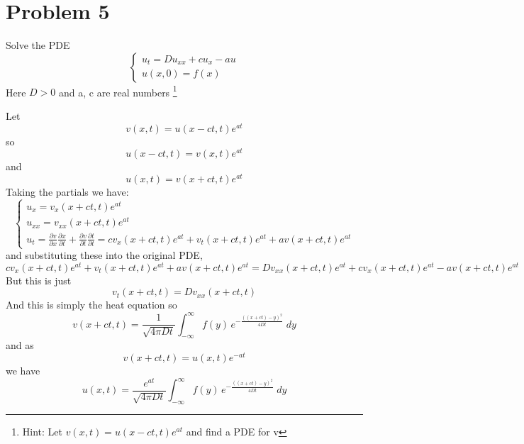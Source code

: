 \documentclass[12pt]{article}
\begin{document}
\pagebreak 
\color{black}
\section*{Problem 5}
Solve the PDE 
\[\begin{cases}
    u_t = Du_{xx} + cu_x - au\\
    u(x, 0) = f(x)
\end{cases}\]
Here $D > 0$ and a, c are real numbers \footnote{Hint: Let $v(x, t) = u(x - ct, t)e^{at}$ and find a PDE for v}

\color{blue}
Let 
\[v(x, t) = u(x - ct, t)e^{at}\]
so 
\[u(x - ct, t) = v(x, t)e^{at}\]
and 
\[u(x, t) = v(x + ct, t)e^{at}\]
Taking the partials we have:
\[\begin{cases}
    u_x = v_x(x + ct, t)e^{at}\\
    u_{xx} = v_{xx}(x + ct, t)e^{at}\\
    u_t = \frac{\partial v}{\partial x}\frac{\partial x}{\partial t} + \frac{\partial v}{\partial t}\frac{\partial t}{\partial t} = cv_x(x + ct, t)e^{at} + v_t(x + ct, t)e^{at} + av(x + ct, t)e^{at}
\end{cases}\]
and substituting these into the original PDE, 
\[cv_x(x + ct, t)e^{at} + v_t(x + ct, t)e^{at} + av(x + ct, t)e^{at} = Dv_{xx}(x + ct, t)e^{at} + cv_x(x + ct, t)e^{at} - av(x + ct, t)e^{at}\]
But this is just 
\[v_t(x + ct, t) = Dv_{xx}(x + ct, t)\]
And this is simply the heat equation so 
\[v(x + ct, t) = \frac{1}{\sqrt{4\pi Dt}} \int_{-\infty}^\infty f(y)\, e^{-\frac{((x + ct) - y)^2}{4Dt}}\; dy\]
and as 
\[v(x + ct, t) = u(x, t)e^{-at}\]
we have  
\[\boxed{u(x, t) = \frac{e^{at}}{\sqrt{4\pi Dt}} \int_{-\infty}^\infty f(y)\, e^{-\frac{((x + ct) - y)^2}{4Dt}}\; dy}\]
\end{document}
